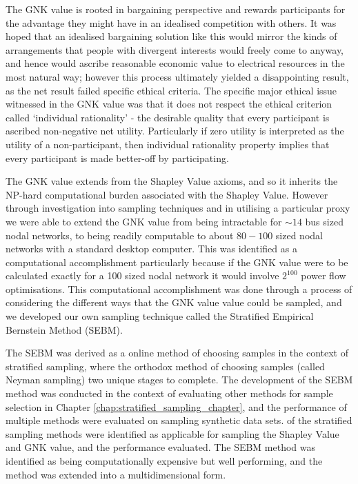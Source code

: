 The GNK value is rooted in bargaining perspective and rewards participants for the advantage they might have in an idealised competition with others.
It was hoped that an idealised bargaining solution like this would mirror the kinds of arrangements that people with divergent interests would freely come to anyway, and hence would ascribe reasonable economic value to electrical resources in the most natural way; however this process ultimately yielded a disappointing result, as the net result failed specific ethical criteria.
The specific major ethical issue witnessed in the GNK value was that it does not respect the ethical criterion called `individual rationality' - the desirable quality that every participant is ascribed non-negative net utility.
Particularly if zero utility is interpreted as the utility of a non-participant, then individual rationality property implies that every participant is made better-off by participating.

The GNK value extends from the Shapley Value axioms, and so it inherits the NP-hard computational burden associated with the Shapley Value.
However through investigation into sampling techniques and in utilising a particular proxy we were able to extend the GNK value from being intractable for $\sim 14$ bus sized nodal networks, to being readily computable to about $80-100$ sized nodal networks with a standard desktop computer.
This was identified as a computational accomplishment particularly because if the GNK value were to be calculated exactly for a 100 sized nodal network it would involve $2^{100}$ power flow optimisations.
This computational accomplishment was done through a process of considering the different ways that the GNK value value could be sampled, and we developed our own sampling technique called the Stratified Empirical Bernstein Method (SEBM).

The SEBM was derived as a online method of choosing samples in the context of stratified sampling, where the orthodox method of choosing samples (called Neyman sampling) \DIFdelbegin {}\DIFdelend \DIFaddbegin {}\DIFaddend two unique stages to complete.
The development of the SEBM method was conducted in the context of evaluating other methods for sample selection in Chapter \ref{chap:stratified_sampling_chapter}, and the performance of multiple methods were evaluated on sampling synthetic data sets.
\DIFdelbegin {}\DIFdelend \DIFaddbegin {}\DIFaddend of the stratified sampling methods were identified as \DIFdelbegin {}\DIFdelend \DIFaddbegin {}\DIFaddend applicable for sampling the Shapley Value and GNK value, and the performance \DIFdelbegin {}\DIFdelend \DIFaddbegin {}\DIFaddend evaluated.
The SEBM method was identified as being computationally expensive but well performing, and the method was extended into a multidimensional form.

